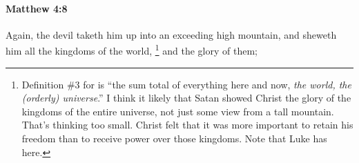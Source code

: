 			\begin{framed}
			\scriptsize
				\begin{compactdesc}
					\item[SBLG] 
				\end{compactdesc}
			\end{framed}

		\paragraph{Matthew 4:8} %
			\label{MATTHEW-4-8}

			Again, the devil taketh him up into an exceeding high mountain, and sheweth him all the kingdoms of the world,%
				\footnote{%
					Definition \#3 for  is ``the sum total of everything here and now, \textit{the world, the (orderly) universe}.'' I think it likely that Satan showed Christ the glory of the kingdoms of the entire universe, not just some view from a tall mountain. That's thinking too small. Christ felt that it was more important to retain his freedom than to receive power over those kingdoms. Note that Luke has  here.
					} 
			and the glory of them;

